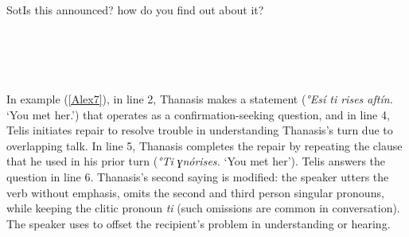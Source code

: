 \documentclass[output=paper]{LSP/langsci}
\begin{document}
\begin{Transcript}[FS {>}{>\hspace{0.1in}}]{Sot}{Is this announced? how do you find out about it?}
\label{Alex6}
\\
\\
 \\
  \\
   \\  
\end{Transcript}


In example (\ref{Alex7}), in line 2, Thanasis makes a statement (\textit{°Εsí ti \underline{}rises aftín.} `You met her.') that operates as a confirmation-seeking question, and in line 4, Telis initiates repair to resolve trouble in understanding Thanasis’s turn due to overlapping talk. In line 5, Thanasis completes the repair by repeating the clause that he used in his prior turn (\textit{°Τi ɣnórises.} `You met her'). Telis answers the question in line 6. Thanasis’s second saying is modified: the speaker utters the verb without emphasis, omits the second and third person singular pronouns, while keeping the clitic pronoun \textit{ti} (such omissions are common in  conversation). The speaker uses  to offset the recipient’s problem in understanding or hearing. 
\end{document}
